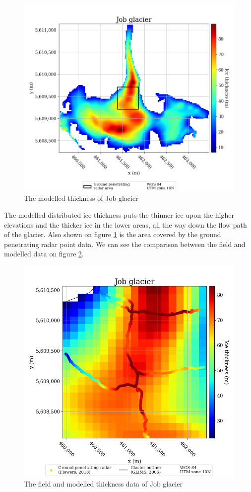 \documentclass[a4, 12pt]{article}
\begin{document}
\begin{figure}[h!]
\centering
\includegraphics[scale=0.45]{../job_kluane_maps/Job glacier_thickness.png}
\caption{The modelled thickness of Job glacier}
\label{fig:job_thickness}
\end{figure}

The modelled distributed ice thickness puts the thinner ice upon the higher elevations and the thicker ice in the lower areas, all the way down the flow path of the glacier. Also shown on figure \ref{fig:job_thickness} is the area covered by the ground penetrating radar point data. We can see the comparison between the field and modelled data on figure \ref{fig:cropped_job_thickness}.

\begin{figure}[h!]
\centering
\includegraphics[scale=0.45]{../job_kluane_maps/Job glacier_cropped_thickness.png}
\caption{The field and modelled thickness data of Job glacier}
\label{fig:cropped_job_thickness}
\end{figure}
\end{document}

